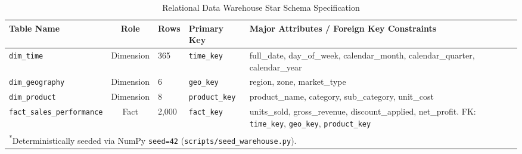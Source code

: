 \begin{table}[h]
\centering
\caption{Relational Data Warehouse Star Schema Specification}
\label{tab:schema}
\begin{tabular}{lcllp{4.5cm}}
\hline
\textbf{Table Name} & \textbf{Role} & \textbf{Rows} & \textbf{Primary Key} & \textbf{Major Attributes / Foreign Key Constraints} \\
\hline
\texttt{dim\_time} & Dimension & 365 & \texttt{time\_key} & full\_date, day\_of\_week, calendar\_month, calendar\_quarter, calendar\_year \\
\texttt{dim\_geography} & Dimension & 6 & \texttt{geo\_key} & region, zone, market\_type \\
\texttt{dim\_product} & Dimension & 8 & \texttt{product\_key} & product\_name, category, sub\_category, unit\_cost \\
\texttt{fact\_sales\_performance} & Fact & 2,000 & \texttt{fact\_key} & units\_sold, gross\_revenue, discount\_applied, net\_profit. \newline FK: \texttt{time\_key}, \texttt{geo\_key}, \texttt{product\_key} \\
\hline
\multicolumn{5}{l}{\footnotesize \textsuperscript{*}Deterministically seeded via NumPy \texttt{seed=42} (\texttt{scripts/seed\_warehouse.py}).} \\
\end{tabular}
\end{table}
